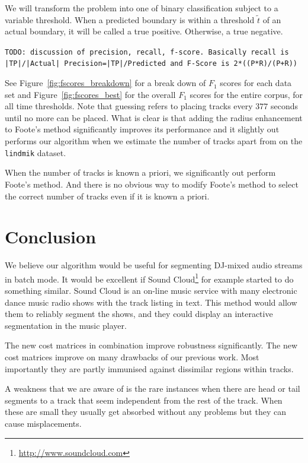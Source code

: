 \documentclass[twocolumn]{article}
\begin{document}
We will transform the problem into one of binary classification subject to a variable threshold. When a predicted boundary is within a threshold $\tilde t$ of an actual boundary, it will be called a true positive. Otherwise, a true negative. 

\texttt{TODO: discussion of precision, recall, f-score. Basically recall is |TP|/|Actual| Precision=|TP|/Predicted and F-Score is 2*((P*R)/(P+R))}

See Figure~\ref{fig:fscores_breakdown} for a break down of $F_1$ scores for each data set and Figure~\ref{fig:fscores_best} for the overall $F_1$ scores for the entire corpus, for all time thresholds. Note that guessing refers to placing tracks every $377$ seconds until no more can be placed. What is clear is that adding the radius enhancement to Foote's method significantly improves its performance and it slightly out performs our algorithm when we estimate the number of tracks apart from on the \texttt{lindmik} dataset. 

When the number of tracks is known a priori, we significantly out perform Foote's method. And there is no obvious way to modify Foote's method to select the correct number of tracks even if it is known a priori. 

\section{Conclusion}\label{conclusions}

We believe our algorithm would be useful for segmenting DJ-mixed audio streams in batch mode. It would be excellent if Sound Cloud\footnote{\url{http://www.soundcloud.com}} for example started to do something similar. Sound Cloud is an on-line music service with many electronic dance music radio shows with the track listing in text. This method would allow them to reliably segment the shows, and they could display an interactive segmentation in the music player. 

The new cost matrices in combination improve robustness significantly. The new cost matrices improve on many drawbacks of our previous work. Most importantly they are partly immunised against dissimilar regions within tracks. 

A weakness that we are aware of is the rare instances when there are head or tail segments to a track that seem independent from the rest of the track. When these are small they usually get absorbed without any problems but they can cause misplacements. 
\end{document}
